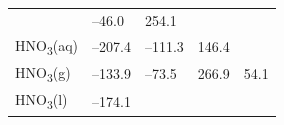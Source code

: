 \documentclass[
  9pt,
]{extbook}
\theoremstyle{definition}
\theoremstyle{definition}
\theoremstyle{definition}
\theoremstyle{remark}
\begin{document}
\begin{longtable}[]{@{}lllll@{}}
\begin{minipage}[t]{0.19\columnwidth}
\end{minipage} & \begin{minipage}[t]{0.20\columnwidth}\raggedright
--46.0\strut
\end{minipage} & \begin{minipage}[t]{0.18\columnwidth}\raggedright
254.1\strut
\end{minipage} & \begin{minipage}[t]{0.18\columnwidth}\raggedright
\strut
\end{minipage}\tabularnewline
\begin{minipage}[t]{0.10\columnwidth}\raggedright
HNO\textsubscript{3}(aq)\strut
\end{minipage} & \begin{minipage}[t]{0.19\columnwidth}\raggedright
--207.4\strut
\end{minipage} & \begin{minipage}[t]{0.20\columnwidth}\raggedright
--111.3\strut
\end{minipage} & \begin{minipage}[t]{0.18\columnwidth}\raggedright
146.4\strut
\end{minipage} & \begin{minipage}[t]{0.18\columnwidth}\raggedright
\strut
\end{minipage}\tabularnewline
\begin{minipage}[t]{0.10\columnwidth}\raggedright
HNO\textsubscript{3}(g)\strut
\end{minipage} & \begin{minipage}[t]{0.19\columnwidth}\raggedright
--133.9\strut
\end{minipage} & \begin{minipage}[t]{0.20\columnwidth}\raggedright
--73.5\strut
\end{minipage} & \begin{minipage}[t]{0.18\columnwidth}\raggedright
266.9\strut
\end{minipage} & \begin{minipage}[t]{0.18\columnwidth}\raggedright
54.1\strut
\end{minipage}\tabularnewline
\begin{minipage}[t]{0.10\columnwidth}\raggedright
HNO\textsubscript{3}(l)\strut
\end{minipage} & \begin{minipage}[t]{0.19\columnwidth}\raggedright
--174.1\strut
\end{minipage} & \begin{minipage}[t]{0.20\columnwidth}\raggedright

\end{minipage}
\end{longtable}
\end{document}
